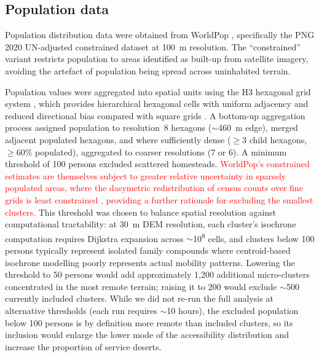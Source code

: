 \documentclass[review,3p,authoryear]{elsarticle}
\newcommand{\rev}[1]{\textcolor{red}{#1}}
\begin{document}
\subsection{Population data}

Population distribution data were obtained from WorldPop \citep{tatem2017, stevens2015}, specifically the PNG 2020 UN-adjusted constrained dataset at \SI{100}{\metre} resolution. The ``constrained'' variant restricts population to areas identified as built-up from satellite imagery, avoiding the artefact of population being spread across uninhabited terrain.

Population values were aggregated into spatial units using the H3 hexagonal grid system \citep{brodsky2018}, which provides hierarchical hexagonal cells with uniform adjacency and reduced directional bias compared with square grids \citep{birch2007}. A bottom-up aggregation process assigned population to resolution~8 hexagons ($\sim$\SI{460}{\metre} edge), merged adjacent populated hexagons, and where sufficiently dense ($\geq$3 child hexagons, $\geq$60\% populated), aggregated to coarser resolutions (7 or 6). A minimum threshold of 100 persons excluded scattered homesteads. \rev{WorldPop's constrained estimates are themselves subject to greater relative uncertainty in sparsely populated areas, where the dasymetric redistribution of census counts over fine grids is least constrained \citep{stevens2015, tatem2017}, providing a further rationale for excluding the smallest clusters.} This threshold was chosen to balance spatial resolution against computational tractability: at \SI{30}{\metre} DEM resolution, each cluster's isochrone computation requires Dijkstra expansion across $\sim$10\textsuperscript{8} cells, and clusters below 100 persons typically represent isolated family compounds where centroid-based isochrone modelling poorly represents actual mobility patterns. Lowering the threshold to 50 persons would add approximately 1,200 additional micro-clusters concentrated in the most remote terrain; raising it to 200 would exclude $\sim$500 currently included clusters. While we did not re-run the full analysis at alternative thresholds (each run requires $\sim$10 hours), the excluded population below 100 persons is by definition more remote than included clusters, so its inclusion would enlarge the lower mode of the accessibility distribution and increase the proportion of service deserts.
\end{document}
